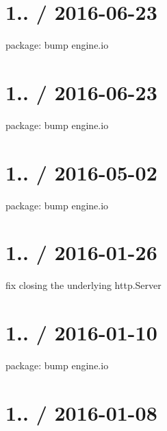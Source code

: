 \section*{1.. / 2016-\/06-\/23 }


\begin{DoxyItemize}
\item package\+: bump {\ttfamily engine.\+io}
\end{DoxyItemize}

\section*{1.. / 2016-\/06-\/23 }


\begin{DoxyItemize}
\item package\+: bump {\ttfamily engine.\+io}
\end{DoxyItemize}

\section*{1.. / 2016-\/05-\/02 }


\begin{DoxyItemize}
\item package\+: bump engine.\+io
\end{DoxyItemize}

\section*{1.. / 2016-\/01-\/26 }


\begin{DoxyItemize}
\item fix closing the underlying {\ttfamily http.\+Server}
\end{DoxyItemize}

\section*{1.. / 2016-\/01-\/10 }


\begin{DoxyItemize}
\item package\+: bump {\ttfamily engine.\+io}
\end{DoxyItemize}

\section*{1.. / 2016-\/01-\/08 }


